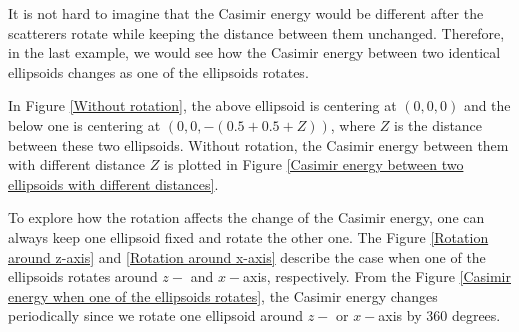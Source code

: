         
It is not hard to imagine that the Casimir energy would be different after the scatterers rotate while keeping the distance between them unchanged. Therefore, 
in the last example, we would see how the Casimir energy between two identical ellipsoids changes as one of the ellipsoids rotates.

In Figure \ref{Without rotation}, the above ellipsoid is centering at $(0,0,0)$ and the below one is centering at $(0, 0, -(0.5+0.5+Z))$, where $Z$ is the 
distance between these two ellipsoids. Without rotation, the Casimir energy between them with different distance $Z$ is plotted in Figure 
\ref{Casimir energy between two ellipsoids with different distances}.

To explore how the rotation affects the change of the Casimir energy, one can always keep one ellipsoid fixed and rotate the other one. The Figure 
\ref{Rotation around z-axis} and \ref{Rotation around x-axis} describe the case when one of the ellipsoids rotates around $z-$ and $x-$axis, respectively.
From the Figure \ref{Casimir energy when one of the ellipsoids rotates}, the Casimir energy changes periodically since we rotate one ellipsoid around 
$z-$ or $x-$axis by 360 degrees. 


